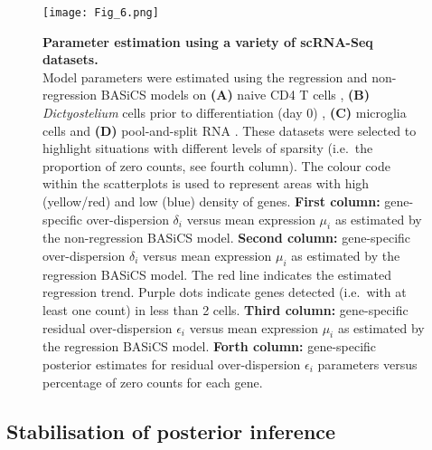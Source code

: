 \newpage

\begin{figure}[!h]
\centering
\texttt{[image: Fig\_6.png]}
\caption[Parameter estimation using a variety of scRNA-Seq datasets]{\textbf{Parameter estimation using a variety of scRNA-Seq datasets.}\\
Model parameters were estimated using the regression and non-regression BASiCS models on \textbf{(A)} naive CD4\plus{} T cells \citep{Martinez-jimenez2017}, \textbf{(B)} \textit{Dictyostelium} cells prior to differentiation (day 0) \citep{Antolovic2017}, \textbf{(C)} microglia cells \citep{Zeisel2015} and \textbf{(D)} pool-and-split RNA \citep{Grun2014}. 
These datasets were selected to highlight situations with different levels of sparsity (i.e.~the proportion of zero counts, see fourth column). 
The colour code within the scatterplots is used to represent areas with high (yellow/red) and low (blue) density of genes. 
\textbf{First column:} gene-specific over-dispersion $\delta_i$ versus mean expression $\mu_i$ as estimated by the non-regression BASiCS model. 
\textbf{Second column:} gene-specific over-dispersion $\delta_i$ versus mean expression $\mu_i$ as estimated by the regression BASiCS model. 
The red line indicates the estimated regression trend. 
Purple dots indicate genes detected (i.e.~with at least one count) in less than 2 cells. 
\textbf{Third column:} gene-specific residual over-dispersion $\epsilon_i$ versus mean expression $\mu_i$ as estimated by the regression BASiCS model. 
\textbf{Forth column:} gene-specific posterior estimates for residual over-dispersion $\epsilon_i$ parameters versus percentage of zero counts for each gene.\\}
\label{fig2:datasets}
\end{figure}

\newpage

\subsection{Stabilisation of posterior inference}
\label{sec2:parameter_stabilization}

